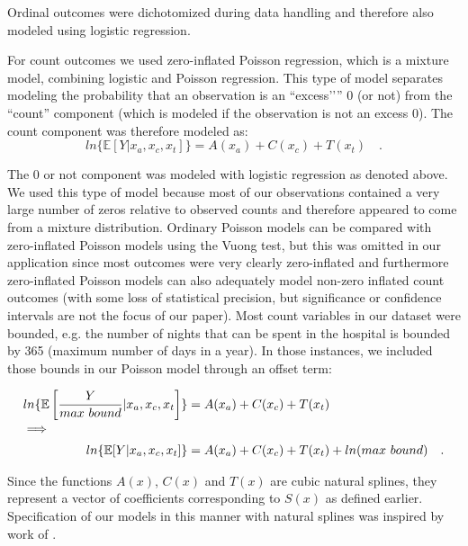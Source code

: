 \documentclass[11pt,oneside,a4paper]{article} %
\begin{document}
\begin{appendices}
Ordinal outcomes were dichotomized during data handling and therefore also modeled using logistic regression.

For count outcomes we used zero-inflated Poisson regression, which is a mixture model, combining logistic and Poisson regression. This type of model separates modeling the probability that an observation is an ``excess'’'' 0 (or not) from the ``count'' component (which is modeled if the observation is not an excess 0). The count component was therefore modeled as:
\begin{equation}
ln\{\mathbb{E}[Y| x_a,x_c,x_t]\}=A(x_a)+C(x_c)+T(x_t) \quad .
\end{equation}

The 0 or not component was modeled with logistic regression as denoted above. We used this type of model because most of our observations contained a very large number of zeros relative to observed counts and therefore appeared to come from a mixture distribution. Ordinary Poisson models can be compared with zero-inflated Poisson models using the Vuong test, but this was omitted in our application since most outcomes were very clearly zero-inflated and furthermore zero-inflated Poisson models can also adequately model non-zero inflated count outcomes (with some loss of statistical precision, but significance or confidence intervals are not the focus of our paper). 
Most count variables in our dataset were bounded, e.g. the number of nights that can be spent in the hospital is bounded by 365 (maximum number of days in a year). In those instances, we included those bounds in our Poisson model through an offset term:

\begin{align}
ln\{\mathbb{E}\left[\frac{Y}{max~bound} |  x_a,x_c,x_t\right]\}&=A(x_a)+C(x_c)+T(x_t) \\
\intertext{$\implies $}\notag 
ln\{\mathbb{E}[ Y|  x_a,x_c,x_t] \} &= A(x_a)+C(x_c)+T(x_t)+ln(max~ bound) \notag \quad.
\end{align}

Since the functions $A(x)$, $C(x)$ and $T(x)$ are cubic natural splines, they represent a vector of coefficients corresponding to $S(x)$ as defined earlier. Specification of our models in this manner with natural splines was inspired by work of \citet{carstensen2007age}.


\end{appendices}
\end{document}
